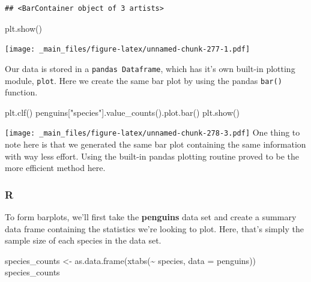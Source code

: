 \documentclass[
]{book}
\newenvironment{Shaded}{\begin{snugshade}}{\end{snugshade}}
\newcommand{\AttributeTok}[1]{\textcolor[rgb]{0.77,0.63,0.00}{#1}}
\newcommand{\FunctionTok}[1]{\textcolor[rgb]{0.00,0.00,0.00}{#1}}
\newcommand{\NormalTok}[1]{#1}
\newcommand{\OtherTok}[1]{\textcolor[rgb]{0.56,0.35,0.01}{#1}}
\newcommand{\SpecialCharTok}[1]{\textcolor[rgb]{0.00,0.00,0.00}{#1}}
\newcommand{\StringTok}[1]{\textcolor[rgb]{0.31,0.60,0.02}{#1}}
\begin{document}
\begin{verbatim}
## <BarContainer object of 3 artists>
\end{verbatim}

\begin{Shaded}
\begin{Highlighting}[]
\NormalTok{plt.show()}
\end{Highlighting}
\end{Shaded}

\texttt{[image: \_main\_files/figure-latex/unnamed-chunk-277-1.pdf]}

Our data is stored in a \texttt{pandas\ Dataframe}, which has it's own built-in plotting module, \texttt{plot}. Here we create the same bar plot by using the pandas \texttt{bar()} function.

\begin{Shaded}
\begin{Highlighting}[]
\NormalTok{plt.clf()}
\NormalTok{penguins[}\StringTok{"species"}\NormalTok{].value\_counts().plot.bar()}
\NormalTok{plt.show()}
\end{Highlighting}
\end{Shaded}

\texttt{[image: \_main\_files/figure-latex/unnamed-chunk-278-3.pdf]}
One thing to note here is that we generated the same bar plot containing the same information with way less effort. Using the built-in pandas plotting routine proved to be the more efficient method here.

\hypertarget{r-42}{%
\subsubsection*{R}\label{r-42}}

To form barplots, we'll first take the \textbf{penguins} data set and create a summary data frame containing the statistics we're looking to plot. Here, that's simply the sample size of each species in the data set.

\begin{Shaded}
\begin{Highlighting}[]
\NormalTok{species\_counts }\OtherTok{\textless{}{-}} \FunctionTok{as.data.frame}\NormalTok{(}\FunctionTok{xtabs}\NormalTok{(}\SpecialCharTok{\textasciitilde{}}\NormalTok{ species, }\AttributeTok{data =}\NormalTok{ penguins))}
\NormalTok{species\_counts}
\end{Highlighting}
\end{Shaded}
\end{document}
